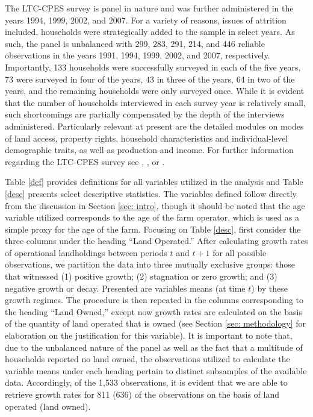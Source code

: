 \documentclass[english]{article}
\begin{document}
The LTC-CPES survey is panel in nature and was further administered in the years 1994, 1999, 2002, and 2007. For a variety of reasons, issues of attrition included, households were strategically added to the sample in select years. As such, the panel is unbalanced with 299, 283, 291, 214, and 446 reliable observations in the years 1991, 1994, 1999, 2002, and 2007, respectively. Importantly, 133 households were successfully surveyed in each of the five years, 73 were surveyed in four of the years, 43 in three of the years, 64 in two of the years, and the remaining households were only surveyed once. While it is evident that the number of households interviewed in each survey year is relatively small, such shortcomings are partially compensated by the depth of the interviews administered. Particularly relevant at present are the detailed modules on modes of land access, property rights, household characteristics and individual-level demographic traits, as well as production and income. For further information regarding the LTC-CPES survey see \citet{fletschner2002}, \citet{carter2003}, or \citet{schechter2007}.

Table \ref{def} provides definitions for all variables utilized in the analysis and Table \ref{desc} presents select descriptive statistics. The variables defined follow directly from the discussion in Section \ref{sec: intro}, though it should be noted that the age variable utilized corresponds to the age of the farm operator, which is used as a simple proxy for the age of the farm. Focusing on Table \ref{desc}, first consider the three columns under the heading ``Land Operated.'' After calculating growth rates of operational landholdings between periods $t$ and $t+1$ for all possible observations, we partition the data into three mutually exclusive groups: those that witnessed (1) positive growth; (2) stagnation or zero growth; and (3) negative growth or decay. Presented are variables means (at time $t$) by these growth regimes. The procedure is then repeated in the columns corresponding to the heading ``Land Owned,'' except now growth rates are calculated on the basis of the quantity of land operated that is owned (see Section \ref{sec: methodology} for elaboration on the justification for this variable). It is important to note that, due to the unbalanced nature of the panel as well as the fact that a multitude of households reported no land owned, the observations utilized to calculate the variable means under each heading pertain to distinct subsamples of the available data. Accordingly, of the 1,533 observations, it is evident that we are able to retrieve growth rates for 811 (636) of the observations on the basis of land operated (land owned).
\end{document}

